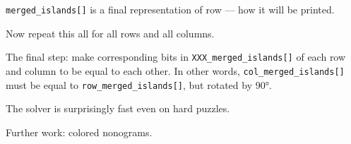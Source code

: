 \verb|merged_islands[]| is a final representation of row --- how it will be printed.

Now repeat this all for all rows and all columns.

The final step: make corresponding bits in \verb|XXX_merged_islands[]| of each row and column to be equal to each other.
In other words, \verb|col_merged_islands[]| must be equal to \verb|row_merged_islands[]|, but rotated by 90°.

The solver is surprisingly fast even on hard puzzles.

Further work: colored nonograms.

